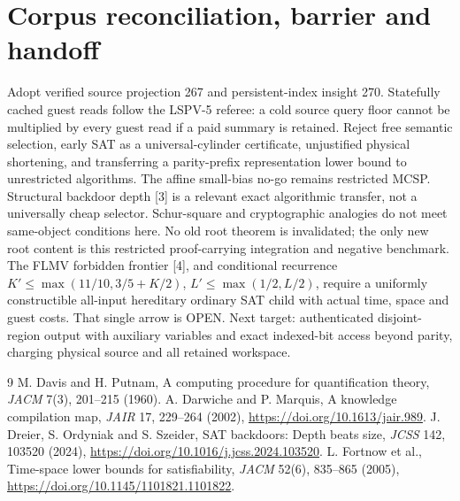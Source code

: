 \documentclass[11pt]{article}
\begin{document}
\section{Corpus reconciliation, barrier and handoff}
Adopt verified source projection 267 and persistent-index insight 270. Statefully cached guest reads follow the LSPV-5 referee: a cold source query floor cannot be multiplied by every guest read if a paid summary is retained. Reject free semantic selection, early SAT as a universal-cylinder certificate, unjustified physical shortening, and transferring a parity-prefix representation lower bound to unrestricted algorithms. The affine small-bias no-go remains restricted MCSP. Structural backdoor depth [3] is a relevant exact algorithmic transfer, not a universally cheap selector. Schur-square and cryptographic analogies do not meet same-object conditions here. No old root theorem is invalidated; the only new root content is this restricted proof-carrying integration and negative benchmark. The FLMV forbidden frontier [4], and conditional recurrence $K'\le\max(11/10,3/5+K/2)$, $L'\le\max(1/2,L/2)$, require a uniformly constructible all-input hereditary ordinary SAT child with actual time, space and guest costs. That single arrow is OPEN. Next target: authenticated disjoint-region output with auxiliary variables and exact indexed-bit access beyond parity, charging physical source and all retained workspace.

\begin{thebibliography}{9}
 M. Davis and H. Putnam, A computing procedure for quantification theory, \emph{JACM} 7(3), 201--215 (1960).
 A. Darwiche and P. Marquis, A knowledge compilation map, \emph{JAIR} 17, 229--264 (2002), \url{https://doi.org/10.1613/jair.989}.
 J. Dreier, S. Ordyniak and S. Szeider, SAT backdoors: Depth beats size, \emph{JCSS} 142, 103520 (2024), \url{https://doi.org/10.1016/j.jcss.2024.103520}.
 L. Fortnow et al., Time-space lower bounds for satisfiability, \emph{JACM} 52(6), 835--865 (2005), \url{https://doi.org/10.1145/1101821.1101822}.
\end{thebibliography}
\end{document}
